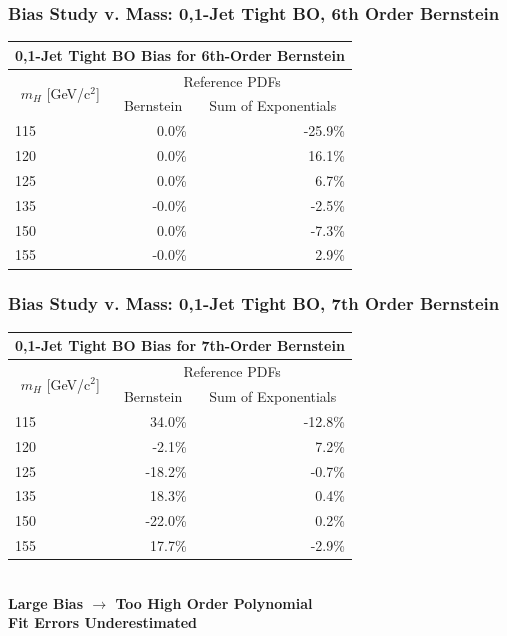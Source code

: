 \documentclass{beamer}
\newcommand{\jra}{\ensuremath{\rightarrow}}
\begin{document}
\begin{frame}
\frametitle{Bias Study v. Mass: 0,1-Jet Tight BO, 6th Order Bernstein}
  \begin{center}
\begin{tabular}{|l|r|r|} \hline 
\multicolumn{3}{|c|}{ \bf 0,1-Jet Tight BO Bias for 6th-Order Bernstein} \\ \hline
\multicolumn{1}{|c|}{\multirow{2}{*}{$m_{H}$ [GeV/c$^{2}$]}} & \multicolumn{2}{c|}{Reference PDFs} \\ \cline{2-3} 
& \multicolumn{1}{c|}{      Bernstein} & \multicolumn{1}{c|}{Sum of Exponentials} \\ \hline
       115 &            0.0\% &          -25.9\% \\ \hline
       120 &            0.0\% &           16.1\% \\ \hline
       125 &            0.0\% &            6.7\% \\ \hline
       135 &           -0.0\% &           -2.5\% \\ \hline
       150 &            0.0\% &           -7.3\% \\ \hline
       155 &           -0.0\% &            2.9\% \\ \hline
\end{tabular}
  \end{center}
\end{frame}

\begin{frame}
\frametitle{Bias Study v. Mass: 0,1-Jet Tight BO, 7th Order Bernstein}
  \begin{center}
\begin{tabular}{|l|r|r|} \hline 
\multicolumn{3}{|c|}{ \bf 0,1-Jet Tight BO Bias for 7th-Order Bernstein} \\ \hline
\multicolumn{1}{|c|}{\multirow{2}{*}{$m_{H}$ [GeV/c$^{2}$]}} & \multicolumn{2}{c|}{Reference PDFs} \\ \cline{2-3} 
& \multicolumn{1}{c|}{      Bernstein} & \multicolumn{1}{c|}{Sum of Exponentials} \\ \hline
       115 &           34.0\% &          -12.8\% \\ \hline
       120 &           -2.1\% &            7.2\% \\ \hline
       125 &          -18.2\% &           -0.7\% \\ \hline
       135 &           18.3\% &            0.4\% \\ \hline
       150 &          -22.0\% &            0.2\% \\ \hline
       155 &           17.7\% &           -2.9\% \\ \hline
\end{tabular}
\\ \vspace{1em}
\textbf{
Large Bias \jra{} Too High Order Polynomial
\\
Fit Errors Underestimated
}
  \end{center}
\end{frame}
\end{document}
